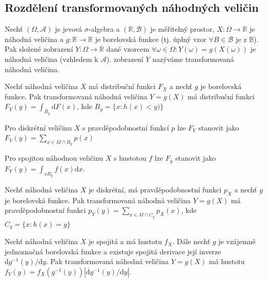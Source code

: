 \subsection{Rozdělení transformovaných náhodných veličin}
\begin{theorem}
Nechť $(\Omega, \mathcal{A})$ je jevová $\sigma$-algebra a $(\mathbb{R},\mathcal{B})$ je měřitelný prostor, $X:\Omega\rightarrow \mathbb{R}$ je náhodná veličina a $g:\mathbb{R}\rightarrow\mathbb{R}$ je borelovská funkce (tj. úplný vzor $\forall B \in \mathcal{B}$ je z $\mathbb{B}$). Pak složené zobrazení $Y:\Omega\rightarrow \mathbb{R}$ dané vzorcem $\forall \omega \in \Omega: Y(\omega)=g(X(\omega))$ je náhodná veličina (vzhledem k $\mathcal{A}$). zobrazení $Y$ nazýváme transformovaná náhodná veličina.
 \end{theorem}
 
 \begin{theorem}
 Nechť náhodná veličina $X$ má distribuční funkci $F_X$ a nechť $g$ je borelovská funkce. Pak transformovaná náhodná veličina $Y=g(X)$ má distribuční funkci $F_Y(y)=\int_{B_y}\mathrm{d}F(x)$, kde $B_y=\{x:h(x)<y) \}$
 \end{theorem}

\begin{notes}
Pro diskrétní veličinu $X$ s pravděpodobnostní funkcí $p$ lze $F_Y$ stanovit jako $F_Y(y)=\sum_{x\in M\cap B_y}p(x)$
\end{notes}

\begin{notes}
Pro spojitou náhodnou veličinu $X$ s hustotou $f$ lze $F_y$ stanovit jako $F_Y(y)=\int_{xB_y} f(x)\mathrm{d}x.$
\end{notes}

\begin{theorem}
Nechť náhodná veličina $X$ je diskrétní, má pravděpodobnostní  funkci $p_X$ a nechť $g$ je borelovská funkce. Pak transformovaná náhodná veličina $Y=g(X)$ má pravděpodobnostní funkci $p_Y(y)=\sum_{x\in M \cap C_y}p_X(x)$, kde $C_y=\{x:h(x)=y\}$
\end{theorem}

\begin{theorem}
Nechť náhodná veličina $X$ je spojitá a má hustotu $f_X$. Dále nechť $g$ je vzájemně jednoznačná borelovská funkce a existuje spojitá derivace její inverze $\mathrm{d}g^{-1}(y)/\mathrm{d}y$. Pak transformovaná náhodná veličina $Y=g(X)$ má hustotu $f_Y(y)=f_X(g^{-1}(y))|\mathrm{d}g^{-1}(y)/\mathrm{d}y|$. 
\end{theorem}

